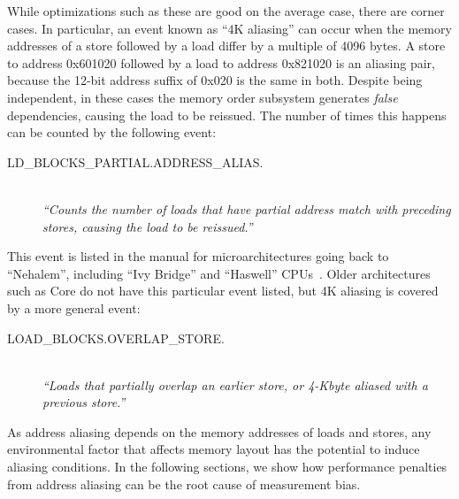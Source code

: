 \documentclass[10pt, conference, compsocconf]{IEEEtran}
\begin{document}
While optimizations such as these are good on the average case, there are corner cases. 
In particular, an event known as ``4K aliasing'' can occur when the memory addresses of a store followed by a load differ by a multiple of 4096 bytes.
A store to address 0x601020 followed by a load to address 0x821020 is an aliasing pair, because the 12-bit address suffix of 0x020 is the same in both. 
Despite being independent, in these cases the memory order subsystem generates \emph{false} dependencies, causing the load to be reissued.
The number of times this happens can be counted by the following event:
\begin{description}
  \item[{\small LD\_BLOCKS\_PARTIAL.ADDRESS\_ALIAS.}] \hfill \\ \emph{``Counts the number of loads that have partial address match with preceding stores, causing the load to be reissued.''} \cite[B.3.4.4]{OptimizationManual}
\end{description}
This event is listed in the manual for microarchitectures going back to ``Nehalem'', including ``Ivy Bridge'' and ``Haswell'' CPUs~\cite{Volume3B}.
Older architectures such as Core do not have this particular event listed, but 4K aliasing is covered by a more general event:
\begin{description}
  \item[{\small LOAD\_BLOCKS.OVERLAP\_STORE.}] \hfill \\ \emph{``Loads that partially overlap an earlier store, or 4-Kbyte aliased with a previous store.''} \cite[Table 19-17]{Volume3B}
\end{description}
As address aliasing depends on the memory addresses of loads and stores, any environmental factor that affects memory layout has the potential to induce aliasing conditions.
In the following sections, we show how performance penalties from address aliasing can be the root cause of measurement bias.
\end{document}
